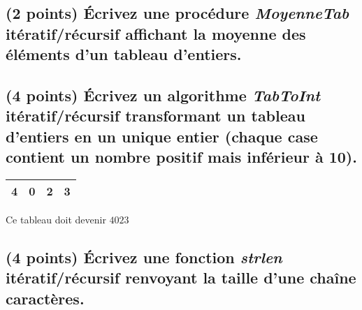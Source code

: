 \documentclass[11pt,a4paper]{article}
\begin{document}
\begin{center}
\end{center}

\bigskip

\bigskip

\begin{center}
\end{center}

\bigskip


\subsection{(2 points) \'Ecrivez une procédure \og \textit{MoyenneTab} \fg{} itératif/récursif affichant la moyenne des éléments d'un tableau d'entiers. }

\bigskip

\begin{center}
\end{center}

\bigskip


\subsection{(4 points) \'Ecrivez un algorithme \og \textit{TabToInt} \fg{} itératif/récursif transformant un tableau d'entiers en un unique entier (chaque case contient un nombre positif mais inférieur à 10). }

\medskip

\begin{center}
  \begin{tabular}{| c | c | c | c |}
    \hline
    4 & 0 & 2 & 3 \\
    \hline
  \end{tabular}

  \smallskip

  Ce tableau doit devenir $ 4023 $
\end{center}

\bigskip

\begin{center}

\end{center}


\bigskip


\subsection{(4 points) \'Ecrivez une fonction \og \textit{strlen} \fg{} itératif/récursif renvoyant la taille d'une chaîne caractères. }

\bigskip

\begin{center}
\end{center}

\bigskip
\end{document}
